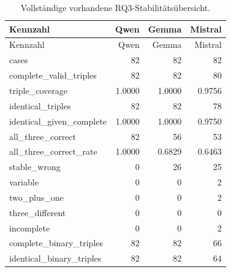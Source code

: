 \begingroup\small
\begin{longtable}{lrrr}
\caption{Vollständige vorhandene RQ3-Stabilitätsübersicht.}\label{tab_v2_rq3_full}\\
\toprule
Kennzahl & Qwen & Gemma & Mistral \\
\midrule
\endfirsthead
\toprule
Kennzahl & Qwen & Gemma & Mistral \\
\midrule
\endhead
cases & 82 & 82 & 82 \\
complete\_valid\_triples & 82 & 82 & 80 \\
triple\_coverage & 1.0000 & 1.0000 & 0.9756 \\
identical\_triples & 82 & 82 & 78 \\
identical\_given\_complete & 1.0000 & 1.0000 & 0.9750 \\
all\_three\_correct & 82 & 56 & 53 \\
all\_three\_correct\_rate & 1.0000 & 0.6829 & 0.6463 \\
stable\_wrong & 0 & 26 & 25 \\
variable & 0 & 0 & 2 \\
two\_plus\_one & 0 & 0 & 2 \\
three\_different & 0 & 0 & 0 \\
incomplete & 0 & 0 & 2 \\
complete\_binary\_triples & 82 & 82 & 66 \\
identical\_binary\_triples & 82 & 82 & 64 \\
\bottomrule
\end{longtable}
\endgroup
